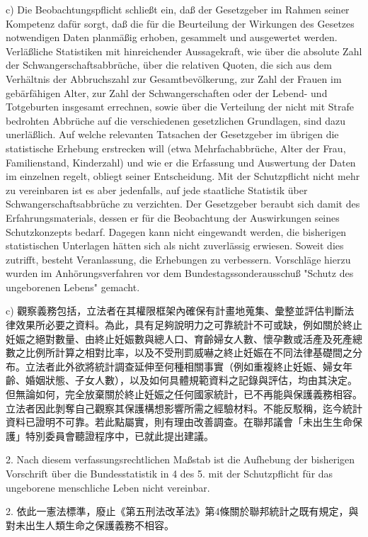 \documentclass[12pt]{article}
\begin{document}
\begin{sourcepara}[title={原文E.191}]
c) Die Beobachtungspflicht schließt ein, daß der Gesetzgeber im Rahmen seiner Kompetenz dafür sorgt, daß die für die Beurteilung der Wirkungen des Gesetzes notwendigen Daten planmäßig erhoben, gesammelt und ausgewertet werden. Verläßliche Statistiken mit hinreichender Aussagekraft, wie über die absolute Zahl der Schwangerschaftsabbrüche, über die relativen Quoten, die sich aus dem Verhältnis der Abbruchszahl zur Gesamtbevölkerung, zur Zahl der Frauen im gebärfähigen Alter, zur Zahl der Schwangerschaften oder der Lebend- und Totgeburten insgesamt errechnen, sowie über die Verteilung der nicht mit Strafe bedrohten Abbrüche auf die verschiedenen gesetzlichen Grundlagen, sind dazu unerläßlich. Auf welche relevanten Tatsachen der Gesetzgeber im übrigen die statistische Erhebung erstrecken will (etwa Mehrfachabbrüche, Alter der Frau, Familienstand, Kinderzahl) und wie er die Erfassung und Auswertung der Daten im einzelnen regelt, obliegt seiner Entscheidung. Mit der Schutzpflicht nicht mehr zu vereinbaren ist es aber jedenfalls, auf jede staatliche Statistik über Schwangerschaftsabbrüche zu verzichten. Der Gesetzgeber beraubt sich damit des Erfahrungsmaterials, dessen er für die Beobachtung der Auswirkungen seines Schutzkonzepts bedarf. Dagegen kann nicht eingewandt werden, die bisherigen statistischen Unterlagen hätten sich als nicht zuverlässig erwiesen. Soweit dies zutrifft, besteht Veranlassung, die Erhebungen zu verbessern. Vorschläge hierzu wurden im Anhörungsverfahren vor dem Bundestagssonderausschuß "Schutz des ungeborenen Lebens" gemacht.
\end{sourcepara}
\begin{transpara}
c) 觀察義務包括，立法者在其權限框架內確保有計畫地蒐集、彙整並評估判斷法律效果所必要之資料。為此，具有足夠說明力之可靠統計不可或缺，例如關於終止妊娠之絕對數量、由終止妊娠數與總人口、育齡婦女人數、懷孕數或活產及死產總數之比例所計算之相對比率，以及不受刑罰威嚇之終止妊娠在不同法律基礎間之分布。立法者此外欲將統計調查延伸至何種相關事實（例如重複終止妊娠、婦女年齡、婚姻狀態、子女人數），以及如何具體規範資料之記錄與評估，均由其決定。但無論如何，完全放棄關於終止妊娠之任何國家統計，已不再能與保護義務相容。立法者因此剝奪自己觀察其保護構想影響所需之經驗材料。不能反駁稱，迄今統計資料已證明不可靠。若此點屬實，則有理由改善調查。在聯邦議會「未出生生命保護」特別委員會聽證程序中，已就此提出建議。
\end{transpara}

\begin{sourcepara}[title={原文E.192}]
2. Nach diesem verfassungsrechtlichen Maßstab ist die Aufhebung der bisherigen Vorschrift über die Bundesstatistik in \abbrArt{} 4 des 5. \abbrStrRG{} mit der Schutzpflicht für das ungeborene menschliche Leben nicht vereinbar.
\end{sourcepara}
\begin{transpara}
2. 依此一憲法標準，廢止《第五刑法改革法》第4條關於聯邦統計之既有規定，與對未出生人類生命之保護義務不相容。
\end{transpara}
\end{document}
